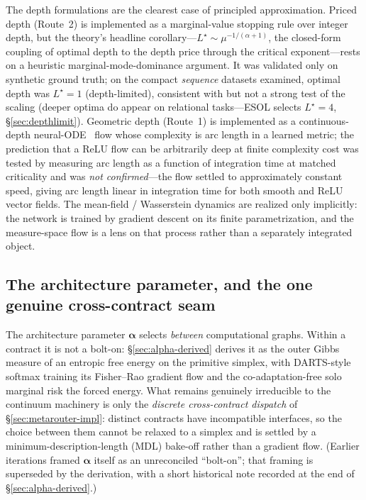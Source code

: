 \documentclass[11pt]{article}
\newcommand{\alphapar}{\bm{\alpha}}
\begin{document}
The depth formulations are the clearest case of principled approximation. Priced depth
(Route~2) is implemented as a marginal-value stopping rule over integer depth, but the
theory's headline corollary---$L^\star\sim\mu^{-1/(\alpha+1)}$, the closed-form coupling of
optimal depth to the depth price through the critical exponent---rests on a heuristic
marginal-mode-dominance argument. It was validated only on synthetic ground truth; on the
compact \emph{sequence} datasets examined, optimal depth was $L^\star=1$ (depth-limited), consistent with
but not a strong test of the scaling (deeper optima do appear on relational tasks---ESOL selects
$L^\star=4$, \S\ref{sec:depthlimit}). Geometric depth (Route~1) is implemented as a
continuous-depth neural-ODE~\cite{chen2018node} flow whose complexity is arc length in a learned metric; the
prediction that a ReLU flow can be arbitrarily deep at finite complexity cost was tested by
measuring arc length as a function of integration time at matched criticality and was
\emph{not confirmed}---the flow settled to approximately constant speed, giving arc length
linear in integration time for both smooth and ReLU vector fields. The mean-field / Wasserstein
dynamics are realized only implicitly: the network is trained by gradient descent on its finite
parametrization, and the measure-space flow is a lens on that process rather than a separately
integrated object.

\subsection{The architecture parameter, and the one genuine cross-contract seam}
\label{sec:alpha}

The architecture parameter $\alphapar$ selects \emph{between} computational graphs. Within a contract it
is not a bolt-on: \S\ref{sec:alpha-derived} derives it as the outer Gibbs measure of an entropic free
energy on the primitive simplex, with DARTS-style softmax training its Fisher--Rao gradient flow and the
co-adaptation-free solo marginal risk the forced energy. What remains genuinely irreducible to the
continuum machinery is only the \emph{discrete cross-contract dispatch} of \S\ref{sec:metarouter-impl}:
distinct contracts have incompatible interfaces, so the choice between them cannot be relaxed to a
simplex and is settled by a minimum-description-length (MDL) bake-off rather than a gradient flow. (Earlier iterations
framed $\alphapar$ itself as an unreconciled ``bolt-on''; that framing is superseded by the derivation,
with a short historical note recorded at the end of \S\ref{sec:alpha-derived}.)
\end{document}
